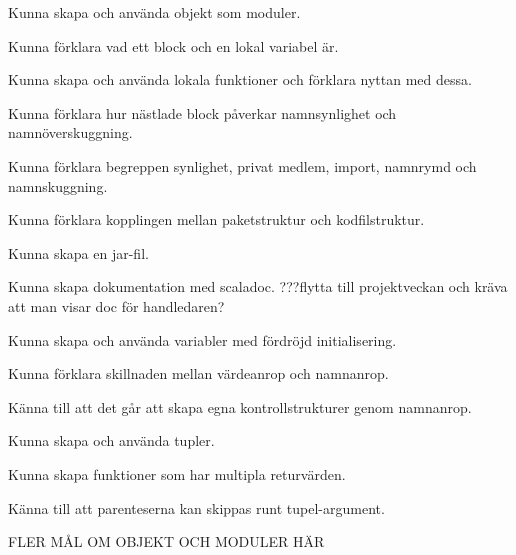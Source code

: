 
\item Kunna skapa och använda objekt som moduler.
\item Kunna förklara vad ett block och en lokal variabel är.
\item Kunna skapa och använda lokala funktioner och förklara nyttan med dessa.
\item Kunna förklara hur nästlade block påverkar namnsynlighet och namnöverskuggning.
\item Kunna förklara begreppen synlighet, privat medlem, import, namnrymd och namnskuggning.

\item Kunna förklara kopplingen mellan paketstruktur och kodfilstruktur.
\item Kunna skapa en jar-fil.

\item Kunna skapa dokumentation med scaladoc. \TODO ???flytta till projektveckan och kräva att man visar doc för handledaren?

\item Kunna skapa och använda variabler med fördröjd initialisering.
\item Kunna förklara skillnaden mellan värdeanrop och namnanrop.
\item Känna till att det går att skapa egna kontrollstrukturer genom namnanrop.

\item Kunna skapa och använda tupler.
\item Kunna skapa funktioner som har multipla returvärden.
\item Känna till att parenteserna kan skippas runt tupel-argument.

\item \TODO FLER MÅL OM OBJEKT OCH MODULER HÄR
